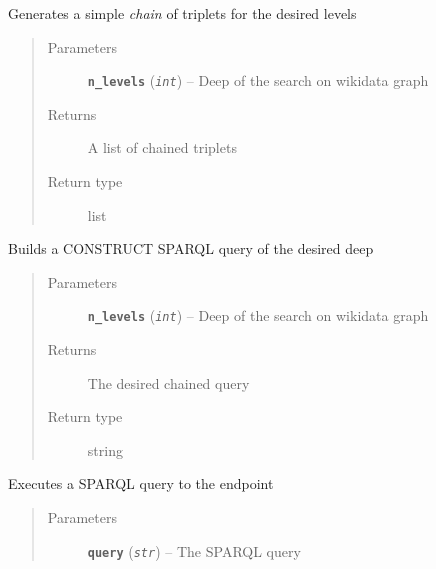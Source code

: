 \documentclass[letterpaper,10pt,english]{sphinxmanual}
\begin{document}
\begin{fulllineitems}

\begin{fulllineitems}
\label{index:dataset.Dataset.build_levels}
Generates a simple \emph{chain} of triplets for the desired levels
\begin{quote}\begin{description}
\item[{Parameters}] \leavevmode
\textbf{\texttt{n\_levels}} (\emph{\texttt{int}}) -- Deep of the search on wikidata graph

\item[{Returns}] \leavevmode
A list of chained triplets

\item[{Return type}] \leavevmode
list

\end{description}\end{quote}

\end{fulllineitems}


\begin{fulllineitems}
\label{index:dataset.Dataset.build_n_levels_query}
Builds a CONSTRUCT SPARQL query of the desired deep
\begin{quote}\begin{description}
\item[{Parameters}] \leavevmode
\textbf{\texttt{n\_levels}} (\emph{\texttt{int}}) -- Deep of the search on wikidata graph

\item[{Returns}] \leavevmode
The desired chained query

\item[{Return type}] \leavevmode
string

\end{description}\end{quote}

\end{fulllineitems}


\begin{fulllineitems}
\label{index:dataset.Dataset.execute_query}
Executes a SPARQL query to the endpoint
\begin{quote}\begin{description}
\item[{Parameters}] \leavevmode
\textbf{\texttt{query}} (\emph{\texttt{str}}) -- The SPARQL query


\end{description}
\end{quote}
\end{fulllineitems}
\end{fulllineitems}
\end{document}
